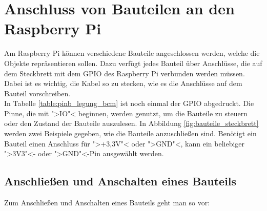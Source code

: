 \documentclass[11pt, a4paper]{article}
\begin{document}
\section*{Anschluss von Bauteilen an den Raspberry Pi}

Am Raspberry Pi können verschiedene Bauteile angeschlossen werden, welche die Objekte repräsentieren sollen. Dazu verfügt jedes Bauteil über Anschlüsse, die auf dem Steckbrett mit dem GPIO des Raspberry Pi verbunden werden müssen. Dabei ist es wichtig, die Kabel so zu stecken, wie es die Anschlüsse auf dem Bauteil vorschreiben.\\

In Tabelle \ref{table:pinb_legung_bcm} ist noch einmal der GPIO abgedruckt. Die Pinne, die mit ">IO"< beginnen, werden genutzt, um die Bauteile zu steuern oder den Zustand der Bauteile auszulesen. In Abbildung \ref{fig:bauteile_steckbrett} werden zwei Beispiele gegeben, wie die Bauteile anzuschließen sind. Benötigt ein Bauteil einen Anschluss für ">+3,3V"< oder ">GND"<, kann ein beliebiger ">3V3"<- oder ">GND"<-Pin ausgewählt werden.


\subsection*{Anschließen und Anschalten eines Bauteils}
Zum Anschließen und Anschalten eines Bauteils geht man so vor:
\end{document}
